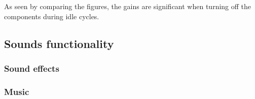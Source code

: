 


As seen by comparing the figures, the gains are significant when turning off the components during idle cycles. 


\subsection{Sounds functionality}


\subsubsection{Sound effects}


\subsubsection{Music}


